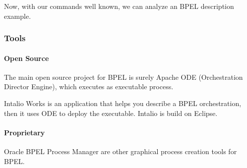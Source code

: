 \documentclass[12pt,a4paper]{article}
\begin{document}
Now, with our commands well known, we can analyze an BPEL description example.

\subsubsection{Tools}
\paragraph{Open Source}
The main open source project for BPEL is surely Apache ODE (Orchestration Director Engine), which executes as executable process.

Intalio Works is an application that helps you describe a BPEL orchestration, then it uses ODE to deploy the executable. Intalio is build on Eclipse.

\paragraph{Proprietary}
Oracle BPEL Process Manager are other graphical process creation tools for BPEL.
\end{document}
